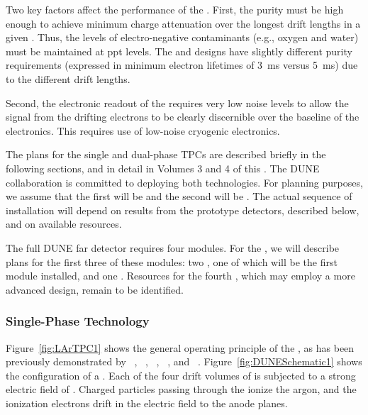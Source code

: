 Two key factors affect the performance of the  .  First, the  purity must be high enough to achieve minimum charge attenuation over the longest drift lengths in a given .  Thus, the levels of electro-negative contaminants (e.g., oxygen and water) must be maintained at ppt levels.  The  and  designs have slightly different purity requirements (expressed in minimum electron lifetimes of \SI{3}{ms} versus \SI{5}{ms}) due to the different drift lengths.

Second, the electronic readout of the  requires very low noise levels to allow the signal from the drifting electrons to be clearly discernible over the baseline of the electronics.  This requires use of low-noise cryogenic electronics. 

The plans for the single and dual-phase TPCs are described briefly in the following sections, and in detail in Volumes 3 and 4 of this .
The DUNE collaboration is committed to deploying both technologies. 
For planning purposes, we assume that the first  will be
\single and the second will be \dual.
The actual sequence of  installation will depend on results from the prototype detectors, described below, and on available resources.

The full DUNE far detector requires four modules. For the , we will describe plans for the first three of these modules: two , one of which will be the first module installed, and one . Resources for the fourth , which may employ a more advanced design, remain to be identified. 

\subsubsection{Single-Phase Technology}
\label{sec:fdsp-exec-splar}

Figure~\ref{fig:LArTPC1} shows the general operating principle of the  , as has been previously demonstrated by  ~\cite{Icarus-T600}, ~\cite{microboone}, ~\cite{Anderson:2012vc}, ~\cite{Cavanna:2014iqa}, and ~\cite{Abi:2017aow}. Figure~\ref{fig:DUNESchematic1} shows the configuration of a  . Each of the four drift volumes of  is subjected to a strong electric field of \spmaxfield. Charged particles passing through the  ionize the argon, and the ionization electrons drift in the electric field to the anode planes. 

